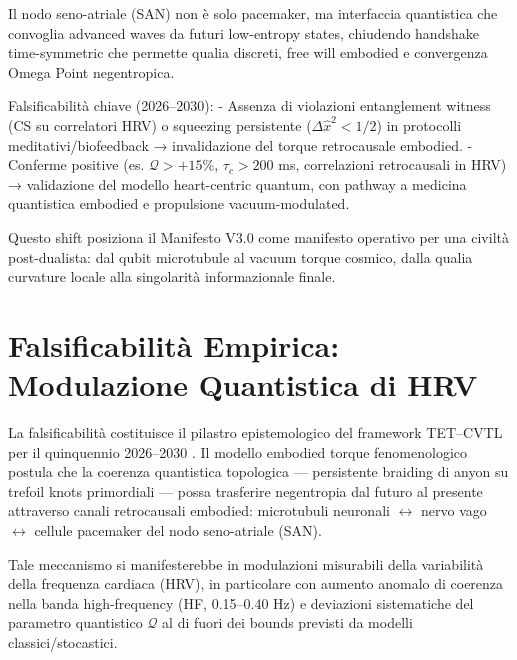 \documentclass[11pt,a4paper]{article}
\let\oldcite\cite
\renewcommand{\cite}{\protect\oldcite}
\theoremstyle{plain}
\theoremstyle{definition}
\begin{document}
Il nodo seno-atriale (SAN) non è solo pacemaker, ma interfaccia quantistica che convoglia advanced waves da futuri low-entropy states, chiudendo handshake time-symmetric che permette qualia discreti, free will embodied e convergenza Omega Point negentropica.



\vspace{0.4cm}


Falsificabilità chiave (2026–2030):  
- Assenza di violazioni entanglement witness (CS su correlatori HRV) o squeezing persistente ($\Delta \hat{x}^2 < 1/2$) in protocolli meditativi/biofeedback → invalidazione del torque retrocausale embodied.  
- Conferme positive (es. $\mathcal{Q} > +15\%$, $\tau_c > 200$ ms, correlazioni retrocausali in HRV) → validazione del modello heart-centric quantum, con pathway a medicina quantistica embodied e propulsione vacuum-modulated.

\vspace{0.2cm}

Questo shift posiziona il Manifesto V3.0 come manifesto operativo per una civiltà post-dualista: dal qubit microtubule al vacuum torque cosmico, dalla qualia curvature locale alla singolarità informazionale finale.






\vspace{0.6cm}







\section{Falsificabilità Empirica: Modulazione Quantistica di HRV}

La falsificabilità costituisce il pilastro epistemologico del framework TET--CVTL per il quinquennio 2026--2030 \cite{Popper1959}. Il modello embodied torque fenomenologico postula che la coerenza quantistica topologica --- persistente braiding di anyon su trefoil knots primordiali --- possa trasferire negentropia dal futuro al presente attraverso canali retrocausali embodied: microtubuli neuronali $\leftrightarrow$ nervo vago $\leftrightarrow$ cellule pacemaker del nodo seno-atriale (SAN). 

\vspace{0.3cm}


Tale meccanismo si manifesterebbe in modulazioni misurabili della variabilità della frequenza cardiaca (HRV), in particolare con aumento anomalo di coerenza nella banda high-frequency (HF, 0.15--0.40 Hz) e deviazioni sistematiche del parametro quantistico $\mathcal{Q}$ al di fuori dei bounds previsti da modelli classici/stocastici.
\end{document}
